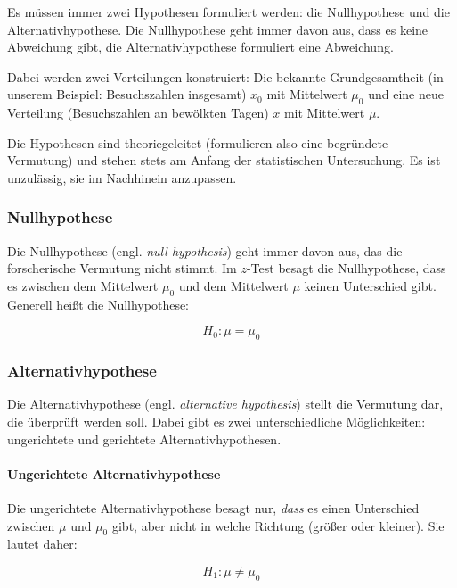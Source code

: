 \documentclass[
  11pt,
  ngerman,
  a4paper,
]{report}
\begin{document}
Es müssen immer zwei Hypothesen formuliert werden: die Nullhypothese und die Alternativhypothese. Die Nullhypothese geht immer davon aus, dass es keine Abweichung gibt, die Alternativhypothese formuliert eine Abweichung.

Dabei werden zwei Verteilungen konstruiert: Die bekannte Grundgesamtheit (in unserem Beispiel: Besuchszahlen insgesamt) \(x_0\) mit Mittelwert \(\mu_0\) und eine neue Verteilung (Besuchszahlen an bewölkten Tagen) \(x\) mit Mittelwert \(\mu\).

Die Hypothesen sind theoriegeleitet (formulieren also eine begründete Vermutung) und stehen stets am Anfang der statistischen Untersuchung. Es ist unzulässig, sie im Nachhinein anzupassen.

\hypertarget{nullhypothese}{%
\subsubsection{Nullhypothese}\label{nullhypothese}}

Die Nullhypothese (engl. \emph{null hypothesis}) geht immer davon aus, das die forscherische Vermutung nicht stimmt. Im \(z\)-Test besagt die Nullhypothese, dass es zwischen dem Mittelwert \(\mu_0\) und dem Mittelwert \(\mu\) keinen Unterschied gibt. Generell heißt die Nullhypothese:

\[
H_0 : \mu = \mu_0
\label{eq:zh0}
\]

\hypertarget{alternativhypothese}{%
\subsubsection{Alternativhypothese}\label{alternativhypothese}}

Die Alternativhypothese (engl. \emph{alternative hypothesis}) stellt die Vermutung dar, die überprüft werden soll. Dabei gibt es zwei unterschiedliche Möglichkeiten: ungerichtete und gerichtete Alternativhypothesen.

\hypertarget{ungerichtete-alternativhypothese}{%
\paragraph{Ungerichtete Alternativhypothese}\label{ungerichtete-alternativhypothese}}

Die ungerichtete Alternativhypothese besagt nur, \emph{dass} es einen Unterschied zwischen \(\mu\) und \(\mu_0\) gibt, aber nicht in welche Richtung (größer oder kleiner). Sie lautet daher:

\[
H_1 : \mu \neq \mu_0
\label{eq:zh1u}
\]
\end{document}
